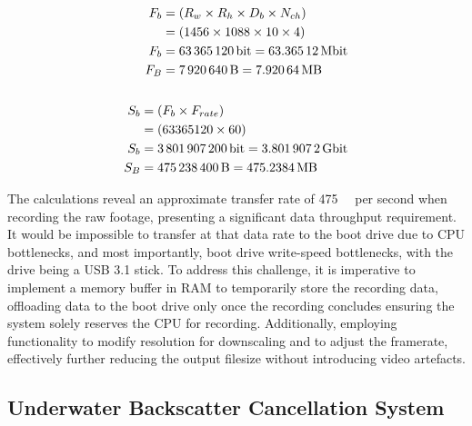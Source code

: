 \begin{align}
    \begin{split} \label{eq:raw_data_per_frame}
        F_b & = (R_w \times R_h \times D_b \times N_{ch}) \\
        & = (1456 \times 1088 \times 10 \times 4) \\
        F_b & = \SI{63365120}{\bit} = \SI{63.36512}{\mega\bit} \\
        F_B & = \SI{7920640}{\byte} = \SI{7.92064}{\mega\byte} 
    \end{split} \\
    \notag \\
    \begin{split} \label{eq:raw_data_per_second}
        S_b & = (F_b \times F_{rate}) \\
        & = (63365120 \times 60) \\
        S_b & = \SI{3801907200}{\bit} = \SI{3.8019072}{\giga\bit} \\
        S_B & = \SI{475238400}{\byte} = \SI{475.2384}{\mega\byte} 
    \end{split}
\end{align}

The calculations reveal an approximate transfer rate of \SI{475}{\mega\byte} per second when recording the raw footage, presenting a significant data throughput requirement. It would be impossible to transfer at that data rate to the boot drive due to CPU bottlenecks, and most importantly, boot drive write-speed bottlenecks, with the drive being a USB 3.1 stick. To address this challenge, it is imperative to implement a memory buffer in RAM to temporarily store the recording data, offloading data to the boot drive only once the recording concludes ensuring the system solely reserves the CPU for recording. Additionally, employing functionality to modify resolution for downscaling and to adjust the framerate, effectively further reducing the output filesize without introducing video artefacts.

\subsection{Underwater Backscatter Cancellation System}
\label{designsystem}

